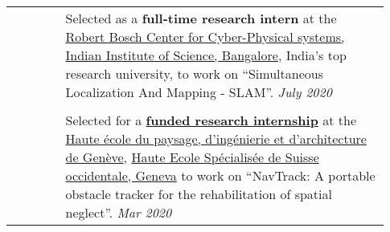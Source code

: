 \documentclass[letterpaper, 10pt, oneside]{article}
\begin{document}
\begin{longtable}{@{} p{0.13\linewidth} p{0.8\linewidth}}
                                                      & Selected as a \textbf{full-time research intern} at the
    \href{https://cps.iisc.ac.in/}{Robert Bosch Center for Cyber-Physical systems, Indian Institute of Science, Bangalore}, India's top research university, to work on
    ``Simultaneous Localization And Mapping - SLAM''.
    \hfill \textsl{July 2020}                                                                                                                                                                                                                                 \\
    \\[-1ex]

                                                      & Selected for a \href{https://drive.google.com/file/d/1Rtlu6aHQKXntWhfEUcgB5tuNYMuvH04b}{\textbf{funded research internship}}
    at the \href{https://www.hesge.ch/hepia/}{Haute école du paysage, d'ingénierie et d'architecture de Genève}, \href{https://www.hesge.ch/geneve}{Haute Ecole Spécialisée de Suisse occidentale, Geneva}
    to work on ``NavTrack: A portable obstacle tracker for the rehabilitation of spatial neglect''.           \hfill \textsl{Mar 2020}                                                                                                                        \\
\end{longtable}
\end{document}
